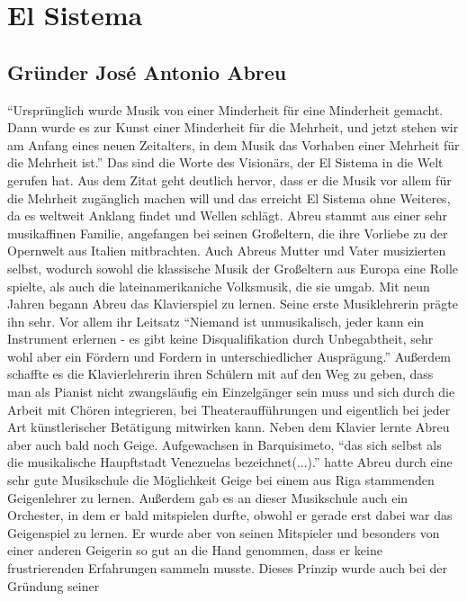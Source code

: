 \section{El Sistema}

\subsection{Gründer José Antonio Abreu}
\enquote{Ursprünglich wurde Musik von einer Minderheit für eine Minderheit
gemacht. Dann wurde es zur Kunst einer Minderheit für die Mehrheit, und jetzt
stehen wir am Anfang eines neuen Zeitalters, in dem Musik das Vorhaben einer
Mehrheit für die Mehrheit ist.} \autocite[5]{kaufmann:el_sistema} Das sind die
Worte des Visionärs, der El Sistema in die Welt gerufen hat. Aus dem Zitat geht
deutlich hervor, dass er die Musik vor allem für die Mehrheit zugänglich machen
will und das erreicht El Sistema ohne Weiteres, da es weltweit Anklang findet
und Wellen schlägt. Abreu stammt aus einer sehr musikaffinen Familie, angefangen
bei seinen Großeltern, die ihre Vorliebe zu der Opernwelt aus Italien
mitbrachten. Auch Abreus Mutter und Vater musizierten selbst, wodurch sowohl die
klassische Musik der Großeltern aus Europa eine Rolle spielte, als auch die
lateinamerikaniche Volksmusik, die sie umgab. Mit neun Jahren begann Abreu das
Klavierspiel zu lernen. Seine erste Musiklehrerin prägte ihn sehr. Vor allem ihr
Leitsatz \enquote{Niemand ist unmusikalisch, jeder kann ein Instrument erlernen
- es gibt keine Disqualifikation durch Unbegabtheit, sehr wohl aber ein Fördern
und Fordern in unterschiedlicher Ausprägung.} \autocite[20]{kaufmann:el_sistema}
Außerdem schaffte es die Klavierlehrerin ihren Schülern mit auf den Weg zu
geben, dass man als Pianist nicht zwangsläufig ein Einzelgänger sein muss und
sich durch die Arbeit mit Chören integrieren, bei Theateraufführungen und
eigentlich bei jeder Art künstlerischer Betätigung mitwirken kann. Neben dem
Klavier lernte Abreu aber auch bald noch Geige. Aufgewachsen in Barquisimeto,
\enquote{das sich selbst als die musikalische Haupftstadt Venezuelas
bezeichnet(...).} \autocite[22]{kaufmann:el_sistema} hatte Abreu durch eine sehr
gute Musikschule die Möglichkeit Geige bei einem aus Riga stammenden
Geigenlehrer zu lernen. Außerdem gab es an dieser Musikschule auch ein
Orchester, in dem er bald mitspielen durfte, obwohl er gerade erst dabei war das
Geigenspiel zu lernen. Er wurde aber von seinen Mitspieler und besonders von
einer anderen Geigerin so gut an die Hand genommen, dass er keine frustrierenden
Erfahrungen sammeln musste. Dieses Prinzip wurde auch bei der Gründung seiner
